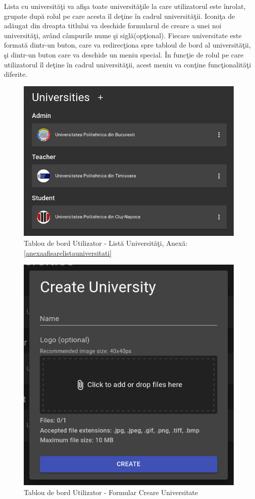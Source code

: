 \documentclass[12pt, a4paper, oneside, romanian]{teza-upb}
\begin{document}
Lista cu universităţi va afişa toate universităţile la care utilizatorul este înrolat, grupate după rolul pe care acesta îl deţine în cadrul universităţii. Iconiţa de adăugat din dreapta titlului va deschide formularul de creare a unei noi universităţi, având câmpurile nume şi siglă(opţional). Fiecare universitate este formată dintr-un buton, care va redirecţiona spre tabloul de bord al universităţii, şi dintr-un buton care va deschide un meniu special. În funcţie de rolul pe care utilizatorul îl deţine în cadrul universităţii, acest meniu va conţine funcţionalităţi diferite.

\begin{figure}[H]
\centering
\includegraphics*[width=\columnwidth]{tablou-de-bord-utilizator-lista-universitati}
\caption{Tablou de bord Utilizator - Listă Universităţi, Anexă: \ref{anexaafisarelistauniversitati}}
\label{tablou-de-bord-utilizator-lista-universitati}
\end{figure}

\begin{figure}[H]
\centering
\includegraphics*[width=0.6\columnwidth]{tablou-de-bord-utilizator-formular-creare-universitate}
\caption{Tablou de bord Utilizator - Formular Creare Universitate}
\label{tablou-de-bord-utilizator-formular-creare-universitate}
\end{figure}
\end{document}
